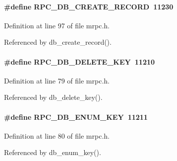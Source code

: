 \paragraph[{RPC\_\-DB\_\-CREATE\_\-RECORD}]{\setlength{\rightskip}{0pt plus 5cm}\#define RPC\_\-DB\_\-CREATE\_\-RECORD~11230}\hfill\label{group__mrpcdefineh_ga0b3e6435045e5a87b0e72ce6c33990e0}

\begin{DoxyItemize}
\item 
\end{DoxyItemize}

Definition at line 97 of file mrpc.h.

Referenced by db\_\-create\_\-record().
\paragraph[{RPC\_\-DB\_\-DELETE\_\-KEY}]{\setlength{\rightskip}{0pt plus 5cm}\#define RPC\_\-DB\_\-DELETE\_\-KEY~11210}\hfill\label{group__mrpcdefineh_ga235ee6e8653969860ed3128c9998d1a3}

\begin{DoxyItemize}
\item 
\end{DoxyItemize}

Definition at line 79 of file mrpc.h.

Referenced by db\_\-delete\_\-key().
\paragraph[{RPC\_\-DB\_\-ENUM\_\-KEY}]{\setlength{\rightskip}{0pt plus 5cm}\#define RPC\_\-DB\_\-ENUM\_\-KEY~11211}\hfill\label{group__mrpcdefineh_ga35ab40580e5431cd16905ca0cc15cbe7}

\begin{DoxyItemize}
\item 
\end{DoxyItemize}

Definition at line 80 of file mrpc.h.

Referenced by db\_\-enum\_\-key().

